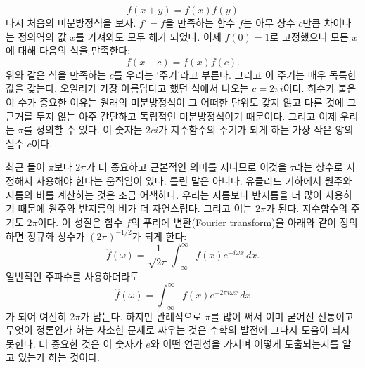 \documentclass[10pt]{article}
\begin{document}
\begin{equation}
  f\left(x+y\right) = f\left(x\right)f\left(y\right)
\end{equation}
다시 처음의 미분방정식을 보자. $f'=f$을 만족하는 함수 $f$는 아무 상수 $c$만큼 차이나는 정의역의 값 $x$를 가져와도 모두 해가 되었다. 이제 $f\left(0\right) = 1$로 고정했으니 모든 $x$에 대해 다음의 식을 만족한다:
$$
  f\left(x+c\right) = f\left(x\right)f\left(c\right).
$$
위와 같은 식을 만족하는 $c$를 우리는 `주기'라고 부른다. 그리고 이 주기는 매우 독특한 값을 갖는다. 오일러가 가장 아름답다고 했던 식에서 나오는 $c = 2\pi i$이다. 허수가 붙은 이 수가 중요한 이유는 원래의 미분방정식이 그 어떠한 단위도 갖지 않고 다른 것에 그 근거를 두지 않는 아주 간단하고 독립적인 미분방정식이기 때문이다. 그리고 이제 우리는 $\pi$를 정의할 수 있다. 이 숫자는 $2c i$가 지수함수의 주기가 되게 하는 가장 작은 양의 실수 $c$이다.\par
최근 들어 $\pi$보다 $2\pi$가 더 중요하고 근본적인 의미를 지니므로 이것을 $\tau$라는 상수로 지정해서 사용해야 한다는 움직임이 있다. 틀린 말은 아니다. 유클리드 기하에서 원주와 지름의 비를 계산하는 것은 조금 어색하다. 우리는 지름보다 반지름을 더 많이 사용하기 때문에 원주와 반지름의 비가 더 자연스럽다. 그리고 이는 $2\pi$가 된다. 지수함수의 주기도 $2\pi$이다. 이 성질은 함수 $f$의 푸리에 변환(Fourier transform)을 아래와 같이 정의하면 정규화 상수가 $\left(2\pi\right)^{-1/2}$가 되게 한다:
$$
  \hat{f}\left(\omega\right) = \frac{1}{\sqrt{2\pi}}\int_{-\infty}^{\infty} f\left(x\right)e^{-i\omega x}\, dx.
$$
일반적인 주파수를 사용하더라도
$$
  \hat{f}\left(\omega \right) = \int_{-\infty}^{\infty}f\left(x\right)e^{-2\pi i \omega x}\, dx
$$
가 되어 여전히 $2\pi$가 남는다. 하지만 관례적으로 $\pi$를 많이 써서 이미 굳어진 전통이고 무엇이 정론인가 하는 사소한 문제로 싸우는 것은 수학의 발전에 그다지 도움이 되지 못한다. 더 중요한 것은 이 숫자가 $e$와 어떤 연관성을 가지며 어떻게 도출되는지를 알고 있는가 하는 것이다.
\end{document}
